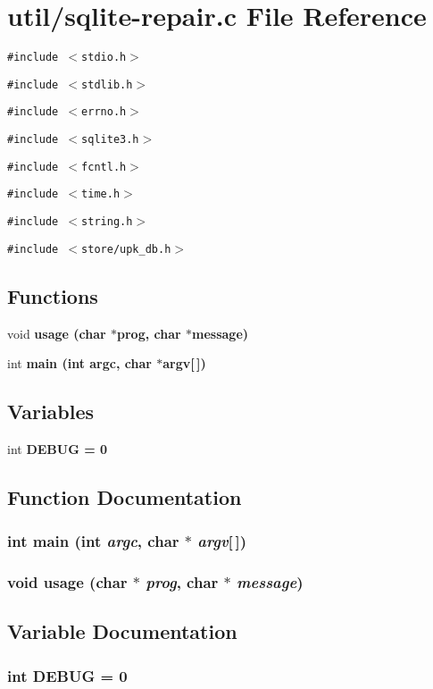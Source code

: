 \section{util/sqlite-repair.c File Reference}
\label{sqlite-repair_8c}
{\tt \#include $<$stdio.h$>$}\par
{\tt \#include $<$stdlib.h$>$}\par
{\tt \#include $<$errno.h$>$}\par
{\tt \#include $<$sqlite3.h$>$}\par
{\tt \#include $<$fcntl.h$>$}\par
{\tt \#include $<$time.h$>$}\par
{\tt \#include $<$string.h$>$}\par
{\tt \#include $<$store/upk\_\-db.h$>$}\par
\subsection*{Functions}
\begin{CompactItemize}
\item 
void \bf{usage} (char $\ast$prog, char $\ast$message)
\item 
int \bf{main} (int argc, char $\ast$argv[$\,$])
\end{CompactItemize}
\subsection*{Variables}
\begin{CompactItemize}
\item 
int \bf{DEBUG} = 0
\end{CompactItemize}


\subsection{Function Documentation}
\subsubsection{\setlength{\rightskip}{0pt plus 5cm}int main (int {\em argc}, char $\ast$ {\em argv}[$\,$])}\label{sqlite-repair_8c_28052c36c3b61c6c0eaa18f5d226118f}


\subsubsection{\setlength{\rightskip}{0pt plus 5cm}void usage (char $\ast$ {\em prog}, char $\ast$ {\em message})}\label{sqlite-repair_8c_bebf605e4f30e1d837cd618870708b06}




\subsection{Variable Documentation}
\subsubsection{\setlength{\rightskip}{0pt plus 5cm}int \bf{DEBUG} = 0}\label{sqlite-repair_8c_9c602b43f791fa5e1018e90fbb9178eb}


